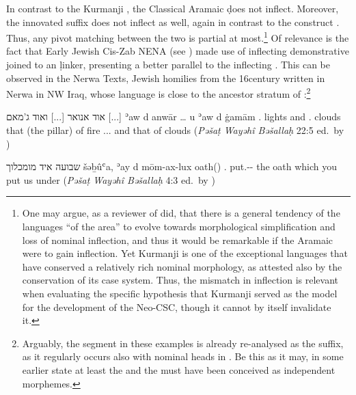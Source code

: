 In contrast to the Kurmanji \lnk* \ez*, the Classical Aramaic \lnk* \d does not inflect.  Moreover, the innovated \cst* \ed suffix does not inflect as well, again in contrast  to the \Kur construct \ez*. Thus, any pivot matching  between the two is partial at most.\footnote{One may argue, as a reviewer of \citet{GutmanContact} did, that  there is a general tendency of the languages \enquote{of the area} to evolve towards morphological simplification and loss of nominal inflection, and thus it would be remarkable if the Aramaic \lnk* were to gain inflection. Yet  Kurmanji is one of the exceptional languages that have conserved a relatively rich nominal morphology, as attested also by the conservation of its case system. Thus, the mismatch in inflection is relevant when evaluating the specific hypothesis that Kurmanji served as the model for the development of the Neo-CSC, though it cannot by itself invalidate it.} Of relevance is the fact that Early Jewish Cis-Zab NENA (see ) made use of inflecting demonstrative  joined to an  \d linker, presenting a better parallel to the inflecting \ez*. This can be observed in the  Nerwa Texts, Jewish homilies from the 16\th century written in Nerwa in NW Iraq, whose language is close to the ancestor stratum of  \JZax:\footnote{Arguably, the  segment in these examples is already re-analysed as the \cst* suffix, as it regularly occurs also with nominal heads in \Nrt. Be this as it may, in some earlier state at least the \dem* and the \lnk* must have been conceived as independent morphemes.}

{אוד אנואר [...] ואוד ג'מאם [...]}
{ʾaw \cb{}d anwār … u\cb{} ʾaw \cb{}d ġamām}
{\dem.\masc{} \cb{}\lnk{} lights {} and\cb{} \dem.\masc{} \cb{}\lnk{} clouds}
{that (the pillar) of fire ... and that of clouds} 
{(\textit{Pəšaṭ Wayəhî Bəšallaḥ} 22:5 ed.\ by \cite[68]{SabarNerwa})}

{שבועה איד מומכלוך}
{šəḇûʿa,\footnotemark{} ʾay \cb{}d mōm-ax-lux}
{oath(\fem) \dem.\fem{} \cb{}\lnk{} put.\pst-\sg-\masc}
{the oath which you put us under}
{(\textit{Pəšaṭ Wayəhî Bəšallaḥ} 4:3 ed.\ by \cite[43]{SabarNerwa})}


